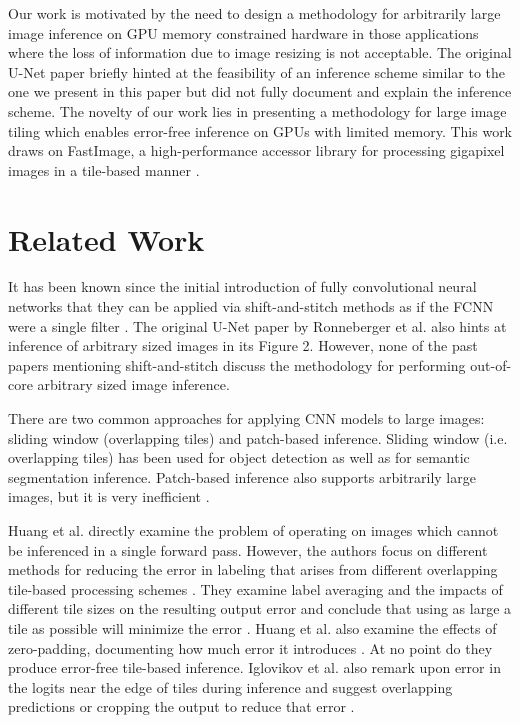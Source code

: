 \documentclass[letterpaper]{article} %
\begin{document}
Our work is motivated by the need to design a methodology for arbitrarily large image inference on GPU memory constrained hardware in those applications where the loss of information due to image resizing is not acceptable. The original U-Net paper \cite{Ronneberger2015a} briefly hinted at the feasibility of an inference scheme similar to the one we present in this paper but did not fully document and explain the inference scheme. 
The novelty of our work lies in presenting a methodology for large image tiling which enables error-free inference on GPUs with limited memory. This work draws on FastImage, a high-performance accessor library for processing gigapixel images in a tile-based manner \cite{Bardakoff2019}.

\section{Related Work}
\label{related-work}

It has been known since the initial introduction of fully convolutional neural networks that they can be applied via shift-and-stitch methods as if the FCNN were a single filter \cite{Long2015,Sherrah2016}.
The original U-Net paper by Ronneberger et al. \cite{Ronneberger2015a} also hints at inference of arbitrary sized images in its Figure 2. However, none of the past papers mentioning shift-and-stitch discuss the methodology for performing out-of-core arbitrary sized image inference.

There are two common approaches for applying CNN models to large images: sliding window (overlapping tiles) and patch-based inference. Sliding window (i.e. overlapping tiles) has been used for object detection \cite{Sermanet2013,VanEtten2019} as well as for semantic segmentation \cite{Lin2019,Volpi2017a} inference. Patch-based inference also supports arbitrarily large images, but it is very inefficient \cite{Volpi2017a,Maggiori2016}.

Huang et al. directly examine the problem of operating on images which cannot be inferenced in a single forward pass. However, the authors focus on different methods for reducing the error in labeling that arises from different overlapping tile-based processing schemes \cite{Huang2019a}. They examine label averaging and the impacts of different tile sizes on the resulting output error and conclude that using as large a tile as possible will minimize the error \cite{Huang2019a}. Huang et al. also examine the effects of zero-padding, documenting how much error it introduces \cite{Huang2019a}. At no point do they produce error-free tile-based inference. Iglovikov et al. also remark upon error in the logits near the edge of tiles during inference and suggest overlapping predictions or cropping the output to reduce that error \cite{Iglovikov2017}. 
\end{document}
